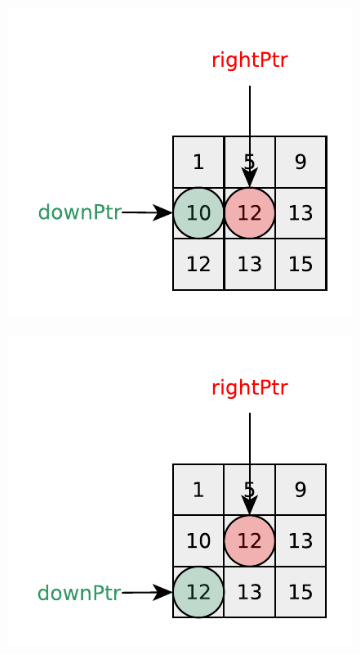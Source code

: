 \begin{figure}
\begin{subfigure}[t]{0.32\textwidth}
		\caption{}
		\label{fig:kth_smallest_in_sorted_matrix:visit2}
	 \end{subfigure}
	 \hfill
	\begin{subfigure}[t]{0.32\textwidth}
		\includegraphics[width=1\linewidth]{sources/kth_smallest_in_sorted_matrix/images/visit3}
		\caption{}
		\label{fig:kth_smallest_in_sorted_matrix:visit3}
	 \end{subfigure}
	 \hfill
	\begin{subfigure}[t]{0.32\textwidth}
		\includegraphics[width=1\linewidth]{sources/kth_smallest_in_sorted_matrix/images/visit4}

\end{subfigure}
\end{figure}
